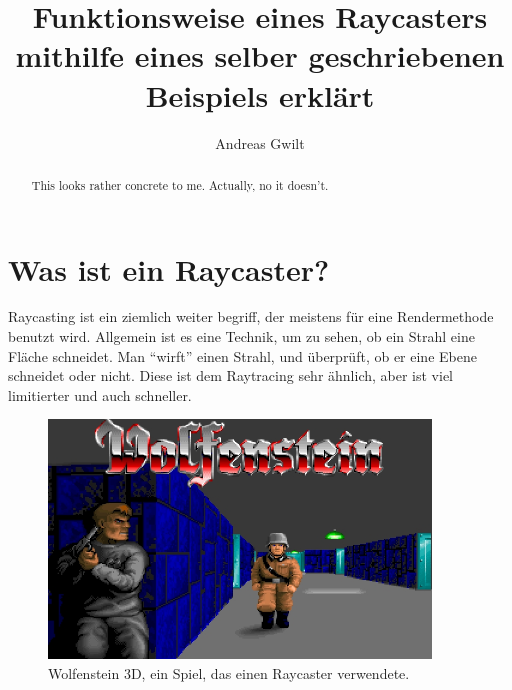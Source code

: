 \documentclass[a4paper,11pt]{report}
\title{Funktionsweise eines Raycasters mithilfe eines selber geschriebenen Beispiels erkl\"art}
\author{Andreas Gwilt}
\begin{document}
\maketitle
\tableofcontents

\begin{abstract}
This looks rather concrete to me. Actually, no it doesn't.
\end{abstract}

\section{Was ist ein Raycaster?}
Raycasting ist ein ziemlich weiter begriff, der meistens für eine Rendermethode benutzt wird. Allgemein ist es eine Technik, um zu sehen, ob ein Strahl eine Fläche schneidet. Man ``wirft'' einen Strahl, und überprüft, ob er eine Ebene schneidet oder nicht. Diese ist dem Raytracing sehr ähnlich, aber ist viel limitierter und auch schneller.

\begin{figure}[htbp] 
        \centering
        \includegraphics[width=4in]{wolfenstein-cover.jpg} 
        \caption{Wolfenstein 3D, ein Spiel, das einen Raycaster verwendete.}
\end{figure}
\end{document}

